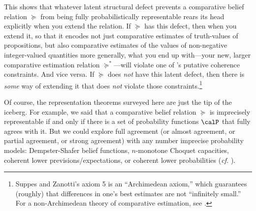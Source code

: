 This shows that whatever latent structural defect prevents a comparative belief relation $\succeq$ from being fully probabilistically representable rears its head explicitly when you extend the relation. If $\succeq$ has this defect, then when you extend it, so that it encodes not just comparative estimates of truth-values of propositions, but also comparative estimates of the values of non-negative integer-valued quantities more generally, what you end up with---your new, larger comparative estimation relation $\succeq^*$---will violate one of \citeauthor{Suppes1976}'s putative coherence constraints. And vice versa. If $\succeq$ does \textit{not} have this latent defect, then there is \textit{some} way of extending it that does \textit{not} violate those constraints.\footnote{Suppes and Zanotti's axiom 5 is an ``Archimedean axiom,'' which guarantees (roughly) that differences in one's best estimates are not ``infinitely small.'' For a non-Archimedean theory of comparative estimation, see \citet{Pederson2014}.}

Of course, the representation theorems surveyed here are just the tip of the iceberg. For example, we said that a comparative belief relation $\succeq$ is imprecisely representable if and only if there is a set of probability functions $\calP$ that fully agrees with it. But we could explore full agreement (or almost agreement, or partial agreement, or strong agreement) with any number imprecise probability models: Dempster-Shafer belief functions, $n$-monotone Choquet capacities, coherent lower previsions/expectations, or coherent lower probabilities (\textit{cf.} \citealp{Walley1991, Walley2000, Augustin2014, Troffaes2014}).

